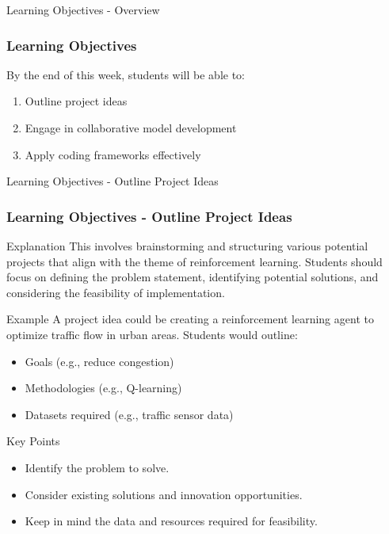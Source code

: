 \documentclass[aspectratio=169]{beamer}
\begin{document}
\begin{frame}[fragile]{Learning Objectives - Overview}
    \frametitle{Learning Objectives}
    By the end of this week, students will be able to:
    \begin{enumerate}
        \item Outline project ideas
        \item Engage in collaborative model development
        \item Apply coding frameworks effectively
    \end{enumerate}
\end{frame}

\begin{frame}[fragile]{Learning Objectives - Outline Project Ideas}
    \frametitle{Learning Objectives - Outline Project Ideas}
    \begin{block}{Explanation}
        This involves brainstorming and structuring various potential projects that align with the theme of reinforcement learning. Students should focus on defining the problem statement, identifying potential solutions, and considering the feasibility of implementation.
    \end{block}
    
    \begin{block}{Example}
        A project idea could be creating a reinforcement learning agent to optimize traffic flow in urban areas. Students would outline:
        \begin{itemize}
            \item Goals (e.g., reduce congestion)
            \item Methodologies (e.g., Q-learning)
            \item Datasets required (e.g., traffic sensor data)
        \end{itemize}
    \end{block}
    
    \begin{block}{Key Points}
        \begin{itemize}
            \item Identify the problem to solve.
            \item Consider existing solutions and innovation opportunities.
            \item Keep in mind the data and resources required for feasibility.
        \end{itemize}
    \end{block}
\end{frame}
\end{document}
